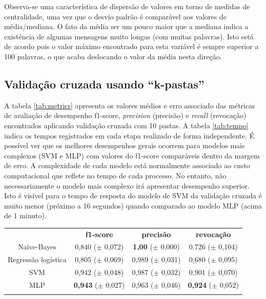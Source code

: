 \documentclass[a4paper,11pt]{article}
\begin{document}
Observa-se uma característica de dispersão de valores em torno de medidas de centralidade, uma vez 
que o desvio padrão é comparável aos valores de média/mediana. O fato da média ser um pouco maior 
que a mediana indica a existência de algumas mensagens muito longas (com muitas palavras). Isto
está de acordo pois o valor máximo encontrado para esta variável é sempre superior a 100 palavras,
o que acaba deslocando o valor da média nesta direção.



\newpage

\vspace{1cm}

\subsection{Validação cruzada usando ``k-pastas''}
A tabela \ref{tab:metrics} apresenta os valores médios e erro associado das métricas de avaliação 
de desempenho f1-score, \textit{precision} (precisão) e \textit{recall} (revocação) encontrados 
aplicando validação cruzada com 10 pastas. A tabela \ref{tab:tempo} indica os tempos registrados 
em cada etapa realizado de forma independente. É possível ver que os melhores desempenhos gerais 
ocorrem para modelos mais complexos (SVM e MLP) com valores do f1-score comparáveis dentro da 
margem de erro. A complexidade de cada modelo está normalmente associado ao custo computacional 
que reflete no tempo de cada processo. No entanto, não necessariamente o modelo mais complexo irá 
apresentar desempenho superior. Isto é visível para o tempo de resposta do modelo de SVM 
da validação cruzada é muito menor (próximo a 16 segundos) quando comparado ao modelo MLP 
(acima de 1 minuto).


\vspace{.5cm}
\begin{center}
\begin{tabular}{cccc}
 \hline
	        &  \textbf{f1-score}  & \textbf{precisão}  & \textbf{revocação} \\
 Naïve-Bayes	&  0,840 ($\pm$ 0,072) & \textbf{1,00} ($\pm$ 0,000)  & 0.726 ($\pm$ 0,104) \\
 Regressão logística & 0,805 ($\pm$ 0,069) & 0,989 ($\pm$ 0,031) & 0,680 ($\pm$ 0,095) \\
 SVM            &  0,942 ($\pm$ 0,048) & 0,987 ($\pm$ 0,032) & 0,901 ($\pm$ 0,070)  \\
 MLP 		&  \textbf{0,943} ($\pm$ 0,027) & 0,963 ($\pm$ 0,046) & \textbf{0,924} ($\pm$ 0,052)  \\
 \hline
 \label{tab:metrics}
\end{tabular}
\end{center}
\end{document}
